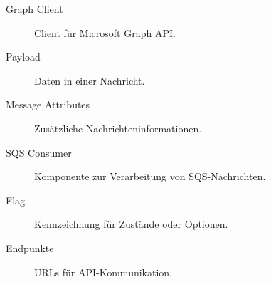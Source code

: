 \begin{description}
    \item[\hypertarget{GraphClient}{Graph Client}] Client für Microsoft Graph API.
    \item[\hypertarget{Payload}{Payload}] Daten in einer Nachricht.
    \item[\hypertarget{MessageAttributes}{Message Attributes}] Zusätzliche Nachrichteninformationen.
    \item[\hypertarget{SQSConsumer}{SQS Consumer}] Komponente zur Verarbeitung von SQS-Nachrichten.
    \item[\hypertarget{Flag}{Flag}] Kennzeichnung für Zustände oder Optionen.
    \item[\hypertarget{Endpoints}{Endpunkte}] URLs für API-Kommunikation.
\end{description}
